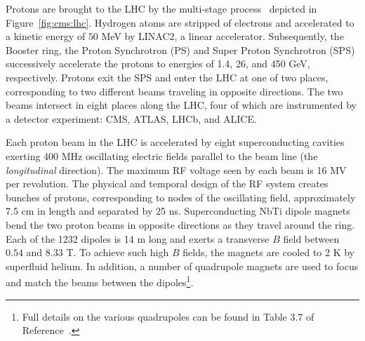 Protons are brought to the LHC by the multi-stage process~\cite{lhctdr3} depicted in Figure~\ref{fig:cms:lhc}.
Hydrogen atoms are stripped of electrons and accelerated to a kinetic energy of $50$ MeV by LINAC2, a linear accelerator.
Subsequently, the Booster ring, the Proton Synchrotron (PS) and Super Proton Synchrotron (SPS) successively accelerate the protons to energies of 1.4, 26, and 450 GeV, respectively. 
Protons exit the SPS and enter the LHC at one of two places, corresponding to two different beams traveling in opposite directions.
The two beams intersect in eight places along the LHC, four of which are instrumented by a detector experiment: CMS, ATLAS, LHCb, and ALICE. 

Each proton beam in the LHC is accelerated by eight superconducting cavities exerting 400 MHz oscillating electric fields parallel to the beam line (the \emph{longitudinal} direction).
The maximum RF voltage seen by each beam is 16 MV per revolution.
The physical and temporal design of the RF system creates bunches of protons, corresponding to nodes of the oscillating field, approximately 7.5 cm in length and separated by 25 ns. 
Superconducting NbTi dipole magnets bend the two proton beams in opposite directions as they travel around the ring. 
Each of the 1232 dipoles is 14 m long and exerts a transverse $B$ field between $0.54$ and $8.33$ T.
To achieve such high $B$ fields, the magnets are cooled to 2 K by superfluid helium.
In addition, a number of quadrupole magnets are used to focus and match the beams between the dipoles\footnote{Full details on the various quadrupoles can be found in Table 3.7 of Reference~\cite{lhcjinst}.}.

